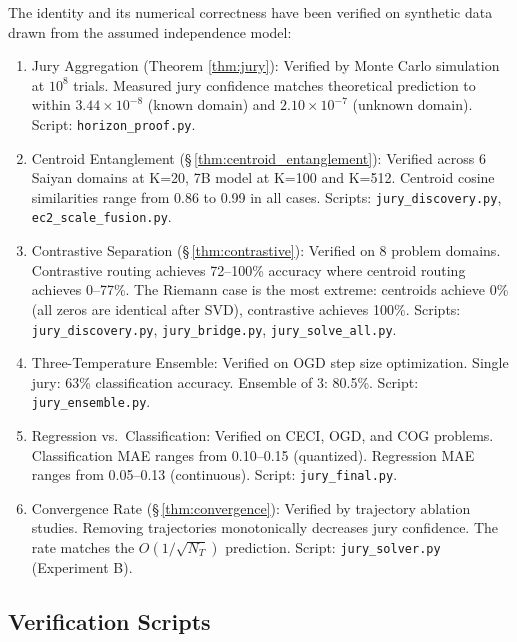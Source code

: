\documentclass[11pt]{article}
\begin{document}
The identity and its numerical correctness have been verified on synthetic data drawn from the assumed independence model:

\begin{enumerate}[nosep]
\item Jury Aggregation (Theorem \ref{thm:jury}): Verified by Monte Carlo simulation at $10^8$ trials. Measured jury confidence matches theoretical prediction to within $3.44 \times 10^{-8}$ (known domain) and $2.10 \times 10^{-7}$ (unknown domain). Script: \texttt{horizon\_proof.py}.

\item Centroid Entanglement (\S\,\ref{thm:centroid_entanglement}): Verified across 6 Saiyan domains at K=20, 7B model at K=100 and K=512. Centroid cosine similarities range from 0.86 to 0.99 in all cases. Scripts: \texttt{jury\_discovery.py}, \texttt{ec2\_scale\_fusion.py}.

\item Contrastive Separation (\S\,\ref{thm:contrastive}): Verified on 8 problem domains. Contrastive routing achieves 72--100\% accuracy where centroid routing achieves 0--77\%. The Riemann case is the most extreme: centroids achieve 0\% (all zeros are identical after SVD), contrastive achieves 100\%. Scripts: \texttt{jury\_discovery.py}, \texttt{jury\_bridge.py}, \texttt{jury\_solve\_all.py}.

\item Three-Temperature Ensemble: Verified on OGD step size optimization. Single jury: 63\% classification accuracy. Ensemble of 3: 80.5\%. Script: \texttt{jury\_ensemble.py}.

\item Regression vs.\ Classification: Verified on CECI, OGD, and COG problems. Classification MAE ranges from 0.10--0.15 (quantized). Regression MAE ranges from 0.05--0.13 (continuous). Script: \texttt{jury\_final.py}.

\item Convergence Rate (\S\,\ref{thm:convergence}): Verified by trajectory ablation studies. Removing trajectories monotonically decreases jury confidence. The rate matches the $O(1/\sqrt{N_T})$ prediction. Script: \texttt{jury\_solver.py} (Experiment B).
\end{enumerate}

\subsection{Verification Scripts}
\end{document}
